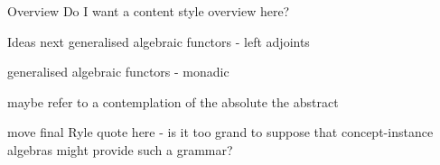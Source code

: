 \begin{frame}
\titlepage
{}
\end{frame}


\begin{frame}{Overview}
Do I want a content style overview here?
\end{frame}

























\begin{frame}{Ideas next}
generalised algebraic functors - left adjoints

generalised algebraic functors - monadic

maybe refer to a contemplation of the absolute the abstract

move final Ryle quote here - is it too grand to suppose that concept-instance algebras might provide such a grammar?
\end{frame}

